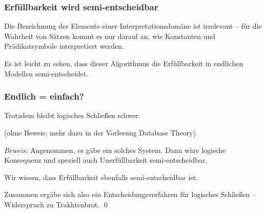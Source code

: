 \documentclass[aspectratio=1610,onlymath]{beamer}
\begin{document}
\begin{frame}\frametitle{Erfüllbarkeit wird semi-entscheidbar}

Die Bezeichnung der Elemente einer Interpretationsdomäne ist irrelevant -- für die Wahrheit von Sätzen kommt es nur darauf an, wie Konstanten und Prädikatsymbole interpretiert werden.\bigskip\pause


Es ist leicht zu sehen, dass dieser Algorithmus die Erfüllbarkeit in endlichen Modellen semi-entscheidet.

\end{frame}

\begin{frame}\frametitle{Endlich = einfach?}\pause

Trotzdem bleibt logisches Schließen schwer:


(ohne Beweis; mehr dazu in der Vorlesung \alert{Database Theory})\pause\bigskip


\emph{Beweis:} Angenommen, es gäbe ein solches System.\pause{} Dann wäre logische Konsequenz und speziell auch Unerfüllbarkeit semi-entscheidbar.\bigskip\pause

Wir wissen, dass Erfüllbarkeit ebenfalls semi-entscheidbar ist.\bigskip\pause

Zusammen ergäbe sich also ein Entscheidungsverfahren für logisches Schließen -- Widerspruch zu Trakhtenbrot.
\qed

\end{frame}
\end{document}
